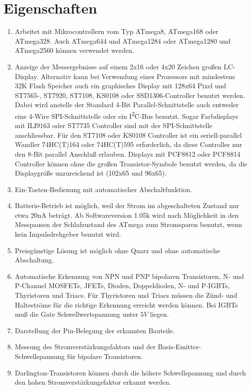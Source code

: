 \chapter{Eigenschaften}
\label{sec:features}
\begin{enumerate}
\item Arbeitet mit Mikrocontrollern vom Typ ATmega8, ATmega168 oder ATmega328. Auch ATmega644 und ATmega1284 oder ATmega1280 und ATmega2560 können verwendet werden.
\item Anzeige der Messergebnisse auf einem 2x16 oder 4x20 Zeichen großen LC-Display.
 Alternativ kann bei Verwendung eines Prozessors mit mindestens 32K Flash Speicher auch ein graphisches Display
 mit 128x64 Pixel und ST7565-, ST7920, ST7108, KS0108 oder SSD1306-Controller benutzt werden.
 Dabei wird anstelle der Standard 4-Bit Parallel-Schnittstelle
 auch entweder eine 4-Wire SPI-Schnittstelle oder ein I\textsuperscript{2}C-Bus benutzt.
 Sogar Farbdisplays mit ILI9163 oder ST7735 Controller sind mit der SPI-Schnittstelle anschliessbar.
 Für den ST7108 oder KS0108 Controller ist ein seriell-parallel Wandler 74HC(T)164 oder 74HC(T)595 erforderlich,
 da diese Controller nur den 8-Bit parallel Anschluß erlauben.
 Displays mit PCF8812 oder PCF8814 Controller können ohne die großen Transistor-Symbole benutzt werden, da
die Displaygröße unzureichend ist (102x65 und 96x65).
\item Ein-Tasten-Bedienung mit automatischer Abschaltfunktion.
\item Batterie-Betrieb ist möglich, weil der Strom im abgeschalteten Zustand nur etwa 20nA beträgt.
Ab Softwareversion 1.05k wird nach Möglichkeit in den Messpausen der Schlafzustand des ATmega zum Stromsparen benutzt, wenn kein Impulsdrehgeber benutzt wird.
\item Preisgünstige Lösung ist möglich ohne Quarz und ohne automatische Abschaltung.
\item Automatische Erkennung von NPN und PNP bipolaren Transistoren, N- und P-Channel MOSFETs, JFETs,
Dioden, Doppeldioden, N- und P-IGBTs, Thyristoren und Triacs.
Für Thyristoren und Triacs müssen die Zünd- und Halteströme für die richtige Erkennung erreicht werden können.
Bei IGBTs muß die Gate Schwellwertspannung unter \(5V\) liegen.
\item Darstellung der Pin-Belegung der erkannten Bauteile.
\item Messung des Stromverstärkungsfaktors und der Basis-Emitter-Schwellspannung für bipolare Transistoren.
\item Darlington-Transistoren können durch die höhere Schwellspannung und durch den hohen Stromverstärkungsfaktor erkannt werden.

\end{enumerate}
